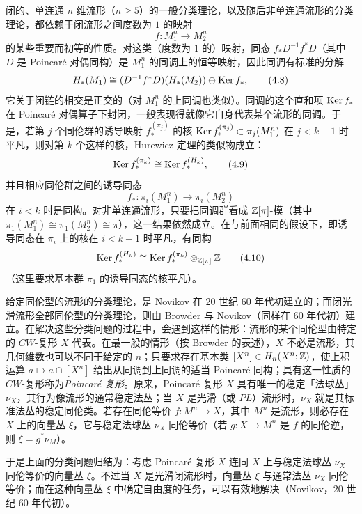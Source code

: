 闭的、单连通 $n$ 维流形（$n\ge5$）的一般分类理论，以及随后非单连通流形的分类理论，都依赖于闭流形之间度数为 $1$ 的映射
\[
f:M^n_1\longrightarrow M^n_2
\]
的某些重要而初等的性质。对这类（度数为 $1$ 的）映射，同态 $f_*D^{-1}f^*D$（其中 $D$ 是 Poincaré 对偶同构）是 $M^n_1$ 的同调上的恒等映射，因此同调有标准的分解
\begin{equation}
H_*(M_1)\cong(D^{-1}f^*D)(H_*(M_2))\oplus\operatorname{Ker} f_*, \tag{4.8}
\end{equation}
它关于闭链的相交是正交的（对 $M^n_1$ 的上同调也类似）。同调的这个直和项 $\operatorname{Ker} f_*$ 在 Poincaré 对偶算子下封闭，一般表现得就像它自身代表某个流形的同调。于是，若第 $j$ 个同伦群的诱导映射 $f^{(\pi_j)}_*$ 的核 $\operatorname{Ker} f^{(\pi_j)}_*\subset\pi_j(M^n_1)$ 在 $j<k-1$ 时平凡，则对第 $k$ 个这样的核，Hurewicz 定理的类似物成立：
\begin{equation}
\operatorname{Ker} f^{(\pi_k)}_*\cong\operatorname{Ker} f^{(H_k)}_*, \tag{4.9}
\end{equation}
并且相应同伦群之间的诱导同态
\[
f_*:\pi_i(M^n_1)\longrightarrow\pi_i(M^n_2)
\]
在 $i<k$ 时是同构。对非单连通流形，只要把同调群看成 $\mathbb{Z}[\pi]$-模（其中 $\pi_1(M^n_1)\cong\pi_1(M^n_2)\cong\pi$），这一结果依然成立。在与前面相同的假设下，即诱导同态在 $\pi_i$ 上的核在 $i<k-1$ 时平凡，有同构
\begin{equation}
\operatorname{Ker} f^{(H_k)}_*\cong\operatorname{Ker} f^{(\pi_k)}_*\otimes_{\mathbb{Z}[\pi]}\mathbb{Z} \tag{4.10}
\end{equation}
（这里要求基本群 $\pi_1$ 的诱导同态的核平凡）。

给定同伦型的流形的分类理论，是 Novikov 在 20 世纪 60 年代初建立的；而闭光滑流形全部同伦型的分类理论，则由 Browder 与 Novikov（同样在 60 年代初）建立。在解决这些分类问题的过程中，会遇到这样的情形：流形的某个同伦型由特定的 $CW$-复形 $X$ 代表。在最一般的情形（按 Browder 的表述），$X$ 不必是流形，其几何维数也可以不同于给定的 $n$；只要求存在基本类 $[X^n]\in H_n(X^n;\mathbb{Z})$，使上积运算 $a\mapsto a\cap[X^n]$ 给出从同调到上同调的适当 Poincaré 同构；具有这一性质的 $CW$-复形称为\emph{Poincaré 复形}。原来，Poincaré 复形 $X$ 具有唯一的稳定「法球丛」$\nu_X$，其行为像流形的通常稳定法丛；当 $X$ 是光滑（或 $PL$）流形时，$\nu_X$ 就是其标准法丛的稳定同伦类。若存在同伦等价 $f:M^n\to X$，其中 $M^n$ 是流形，则必存在 $X$ 上的向量丛 $\xi$，它与稳定法球丛 $\nu_X$ 同伦等价（若 $g:X\to M^n$ 是 $f$ 的同伦逆，则 $\xi=g^*\nu_M$）。

于是上面的分类问题归结为：考虑 Poincaré 复形 $X$ 连同 $X$ 上与稳定法球丛 $\nu_X$ 同伦等价的向量丛 $\xi$。不过当 $X$ 是光滑闭流形时，向量丛 $\xi$ 与通常法丛 $\nu_X$ 同伦等价；而在这种向量丛 $\xi$ 中确定自由度的任务，可以有效地解决（Novikov，20 世纪 60 年代初）。

